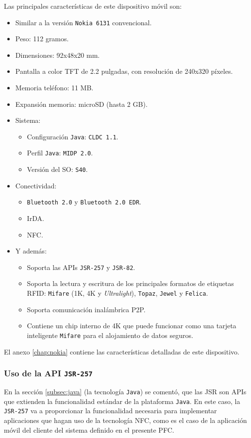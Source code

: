 Las principales características de este dispositivo móvil son:
\begin{itemize}
\item Similar a la versión \texttt{Nokia 6131} convencional.
\item Peso: 112 gramos.
\item Dimensiones: 92x48x20 mm.
\item Pantalla a color \acs{TFT} de 2.2 pulgadas, con resolución de 240x320 
píxeles.
\item Memoria teléfono: 11 MB.
\item Expansión memoria: microSD (hasta 2 GB).
\item Sistema:
  \begin{itemize}
  \item Configuración \texttt{Java}: \texttt{CLDC 1.1}.
  \item Perfil \texttt{Java}: \texttt{\acs{MIDP} 2.0}.
  \item Versión del \acs{SO}: \texttt{S40}.
  \end{itemize}
\item Conectividad:
  \begin{itemize}
  \item \texttt{Bluetooth 2.0} y \texttt{Bluetooth 2.0 EDR}.
  \item \acs{IrDA}.
  \item \acs{NFC}.
  \end{itemize}
\item Y además:
  \begin{itemize}
  \item Soporta las \acs{API}s \texttt{\acs{JSR}-257} y \texttt{\acs{JSR}-82}.
  \item Soporta la lectura y escritura de los principales formatos de
  etiquetas \acs{RFID}: \texttt{Mifare} (1K, 4K y \emph{Ultralight}),
  \texttt{Topaz}, \texttt{Jewel} y \texttt{Felica}.
  \item Soporta comunicación inalámbrica \acs{P2P}.
  \item Contiene un chip interno de 4K que puede funcionar como una tarjeta
  inteligente \texttt{Mifare} para el alojamiento de datos seguros.
  \end{itemize}
\end{itemize}

El anexo \ref{chap:nokia} contiene las características detalladas de este
dispositivo.

  \subsubsection{Uso de la \acs{API} \texttt{\acs{JSR}-257}}
En la sección \ref{subsec:java} (la tecnología \texttt{Java}) se comentó, que
las \acs{JSR} son \acs{API}s que extienden la funcionalidad estándar de la 
plataforma \texttt{Java}. En este caso, la \texttt{\acs{JSR}-257} va a
proporcionar la funcionalidad necesaria para implementar aplicaciones que
hagan uso de la tecnología \acs{NFC}, como es el caso de la aplicación móvil
del cliente del sistema definido en el presente \acs{PFC}.

